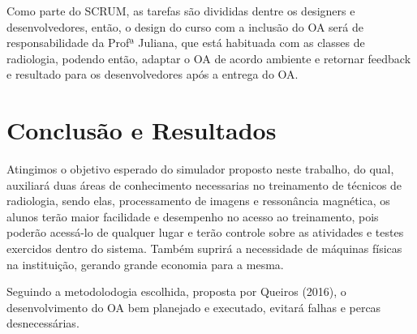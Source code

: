 \documentclass[12pt,openright,oneside,a4paper,english,french,spanish,brazil]{unifil}
\begin{document}
\par Como parte do SCRUM, as tarefas são divididas dentre os designers e desenvolvedores, então, o design do curso com a inclusão do OA será de responsabilidade da Profª Juliana, que está habituada com as classes de radiologia, podendo então, adaptar o OA de acordo ambiente e retornar feedback e resultado para os desenvolvedores após a entrega do OA.

\chapter {Conclusão e Resultados}
Atingimos o objetivo esperado do simulador proposto neste trabalho, do qual, auxiliará duas áreas de conhecimento necessarias no treinamento de técnicos de radiologia, sendo elas, processamento de imagens e ressonância magnética, os alunos terão maior facilidade e desempenho no acesso ao treinamento, pois poderão acessá-lo de qualquer lugar e terão controle sobre as atividades e testes exercidos dentro do sistema. Também suprirá a necessidade de máquinas físicas na instituição, gerando grande economia para a mesma.
\par Seguindo a metodolodogia escolhida, proposta por Queiros (2016), o desenvolvimento do OA bem planejado e executado, evitará falhas e percas desnecessárias.
\cleardoublepage

\postextual

\end{document}

